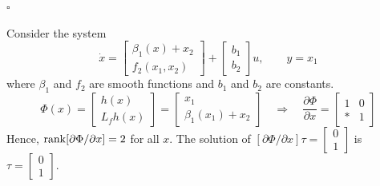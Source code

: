 \documentclass[12pt,a4paper,oneside]{book}
\begin{document}
\begin{onehalfspace}
\begin{corollary}
		\hfill$\square$
\end{corollary}
\begin{example}
	Consider the system
	\begin{equation}
		\dot{x}=\begin{bmatrix} \beta_1(x)+x_2 \\[6pt] f_2(x_1,x_2)	\end{bmatrix} + \begin{bmatrix} b_1 \\[6pt] b_2	\end{bmatrix}u,\qquad y=x_1
	\end{equation}
	where $\beta_1$ and $f_2$ are smooth functions and $b_1$ and $b_2$ are constants.
	\begin{equation*}
		\Phi(x)=\begin{bmatrix} h(x) \\[6pt] L_fh(x) \end{bmatrix} = \begin{bmatrix} x_1 \\[6pt] \beta_1(x_1) + x_2 \end{bmatrix} \quad \Rightarrow \quad \frac{\partial \Phi}{\partial x}=\begin{bmatrix} 1 & 0 \\[6pt] * & 1 \end{bmatrix}
	\end{equation*}
	Hence, $\rank[\partial\Phi/\partial x]=2$ for all $x$. The solution of $[\partial \Phi/\partial x]\tau=\begin{bmatrix} 0 \\[6pt] 1 \end{bmatrix}$ is $\tau=\begin{bmatrix} 0\\[6pt]1 \end{bmatrix}$.
	

\end{example}
\end{onehalfspace}
\end{document}
